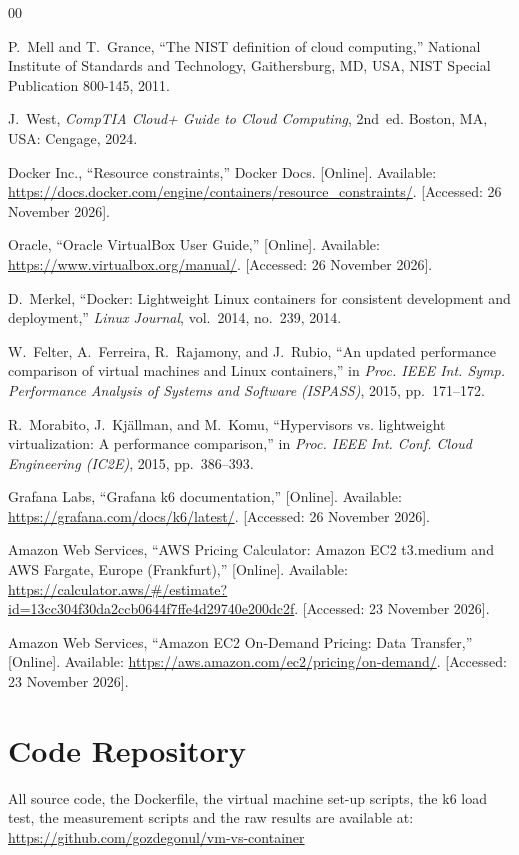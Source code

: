 \documentclass[conference,a4paper]{IEEEtran}
\begin{document}
\begin{thebibliography}{00}

 P.~Mell and T.~Grance, ``The NIST definition of cloud computing,'' National Institute of Standards and Technology, Gaithersburg, MD, USA, NIST Special Publication 800-145, 2011.

 J.~West, \textit{CompTIA Cloud+ Guide to Cloud Computing}, 2nd~ed. Boston, MA, USA: Cengage, 2024.

 Docker Inc., ``Resource constraints,'' Docker Docs. [Online]. Available: \url{https://docs.docker.com/engine/containers/resource_constraints/}. [Accessed: 26 November 2026].

 Oracle, ``Oracle VirtualBox User Guide,'' [Online]. Available: \url{https://www.virtualbox.org/manual/}. [Accessed: 26 November 2026].

 D.~Merkel, ``Docker: Lightweight Linux containers for consistent development and deployment,'' \textit{Linux Journal}, vol.~2014, no.~239, 2014.

 W.~Felter, A.~Ferreira, R.~Rajamony, and J.~Rubio, ``An updated performance comparison of virtual machines and Linux containers,'' in \textit{Proc. IEEE Int. Symp. Performance Analysis of Systems and Software (ISPASS)}, 2015, pp.~171--172.

 R.~Morabito, J.~Kj\"allman, and M.~Komu, ``Hypervisors vs. lightweight virtualization: A performance comparison,'' in \textit{Proc. IEEE Int. Conf. Cloud Engineering (IC2E)}, 2015, pp.~386--393.

 Grafana Labs, ``Grafana k6 documentation,'' [Online]. Available: \url{https://grafana.com/docs/k6/latest/}. [Accessed: 26 November 2026].

 Amazon Web Services, ``AWS Pricing Calculator: Amazon EC2 t3.medium and AWS Fargate, Europe (Frankfurt),'' [Online]. Available: \url{https://calculator.aws/\#/estimate?id=13cc304f30da2ccb0644f7ffe4d29740e200dc2f}. [Accessed: 23 November 2026].

 Amazon Web Services, ``Amazon EC2 On-Demand Pricing: Data Transfer,'' [Online]. Available: \url{https://aws.amazon.com/ec2/pricing/on-demand/}. [Accessed: 23 November 2026].

\end{thebibliography}

\appendix

\section{Code Repository}
\label{app:code}
All source code, the Dockerfile, the virtual machine set-up scripts, the k6 load test, the measurement scripts and the raw results are available at: \url{https://github.com/gozdegonul/vm-vs-container}
\end{document}
